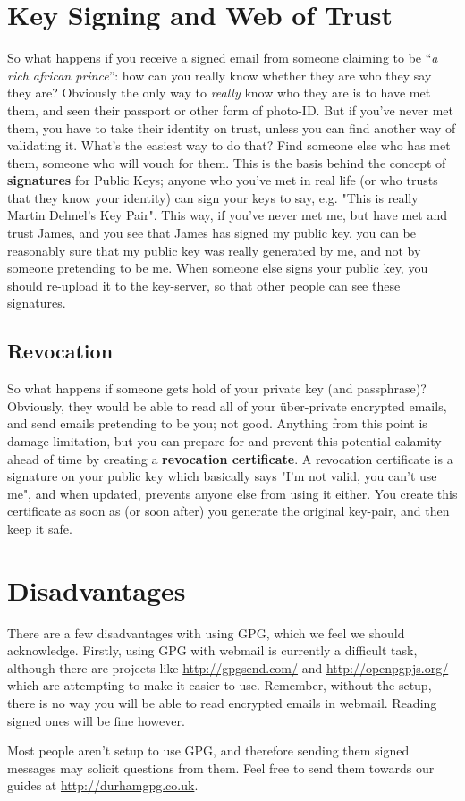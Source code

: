 \section{Key Signing and Web of Trust}

So what happens if you receive a signed email from someone claiming to be ``\textit{a rich african prince}'': how can you really know whether they are who they say they are? Obviously the only way to \textit{really} know who they are is to have met them, and seen their passport or other form of photo-ID. But if you've never met them, you have to take their identity on trust, unless you can find another way of validating it. What's the easiest way to do that? Find someone else who has met them, someone who will vouch for them. This is the basis behind the concept of \textbf{signatures} for Public Keys; anyone who you've met in real life (or who trusts that they know your identity) can sign your keys to say, e.g. "This is really Martin Dehnel's Key Pair". This way, if you've never met me, but have met and trust James, and you see that James has signed my public key, you can be reasonably sure that my public key was really generated by me, and not by someone pretending to be me. When someone else signs your public key, you should re-upload it to the key-server, so that other people can see these signatures.

\subsection{Revocation}
So what happens if someone gets hold of your private key (and passphrase)? Obviously, they would be able to read all of your \"{u}ber-private encrypted emails, and send emails pretending to be you; not good. Anything from this point is damage limitation, but you can prepare for and prevent this potential calamity ahead of time by creating a \textbf{revocation certificate}. A revocation certificate is a signature on your public key which basically says "I'm not valid, you can't use me", and when updated, prevents anyone else from using it either. You create this certificate as soon as (or soon after) you generate the original key-pair, and then keep it safe.


\section{Disadvantages}

There are a few disadvantages with using GPG, which we feel we should acknowledge. Firstly, using GPG with webmail is currently a difficult task, although there are projects like \href{http://gpgsend.com/}{http://gpgsend.com/} and \href{http://openpgpjs.org/}{http://openpgpjs.org/} which are attempting to make it easier to use. Remember, without the setup, there is no way you will be able to read encrypted emails in webmail. Reading signed ones will be fine however.

Most people aren't setup to use GPG, and therefore sending them signed messages may solicit questions from them. Feel free to send them towards our guides at \href{http://durhamgpg.co.uk}{http://durhamgpg.co.uk}.

